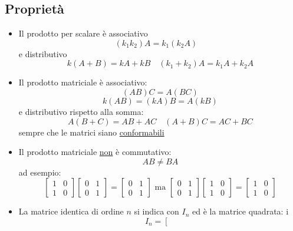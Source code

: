 \documentclass[12pt,a4paper,oneside]{article}
\begin{document}
\subsection{Proprietà}
\begin{itemize}
	\item Il prodotto per scalare è associativo
	      \[
		      \left( k_1k_2 \right) A = k_1\left( k_2A \right) \quad
	      \]
	      e distributivo
	      \[
		      k \left( A + B  \right) = kA + kB \quad
		      \left( k_1 + k_2 \right) A = k_1 A + k_2 A
	      \]
	\item Il prodotto matriciale è associativo:
	      \[
		      \left( AB \right) C = A \left( BC \right)
	      \]
	      \[
		      k \left( AB  \right) = \left( k A  \right) B = A \left( kB \right)
	      \]
	      e distributivo rispetto alla somma:
	      \[
		      A \left( B+C \right)  = AB + AC \quad \left( A+B \right) C = AC + BC
	      \]
	      sempre che le matrici siano  \underline{conformabili}
	\item Il prodotto matriciale \underline{non} è commutativo:
	      \[
		      AB \neq BA
	      \]
	      ad esempio:
	      $$
		      \left[\begin{array}{ll}
				      1 & 0 \\
				      1 & 0
			      \end{array}\right]\left[\begin{array}{ll}
				      0 & 1 \\
				      0 & 1
			      \end{array}\right]=\left[\begin{array}{ll}
				      0 & 1 \\
				      0 & 1
			      \end{array}\right] \text { ma }\left[\begin{array}{ll}
				      0 & 1 \\
				      0 & 1
			      \end{array}\right]\left[\begin{array}{ll}
				      1 & 0 \\
				      1 & 0
			      \end{array}\right]=\left[\begin{array}{ll}
				      1 & 0 \\
				      1 & 0
			      \end{array}\right]
	      $$
	\item La matrice identica di ordine $n$ si indica con $I_n$ ed è la matrice quadrata:
	      i
	      $$
		      I_n=\left[\begin{array}{cccc}

\end{array}$$
\end{itemize}
\end{document}
